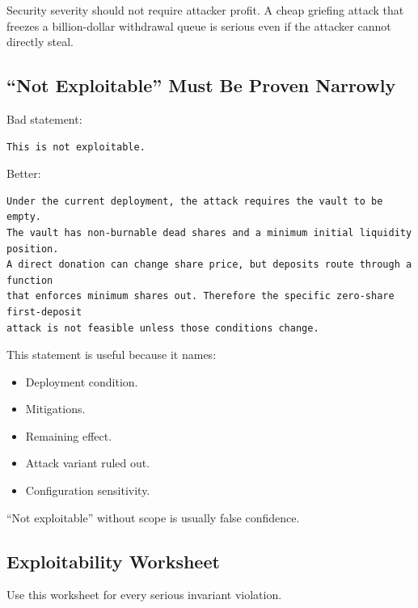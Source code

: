 Security severity should not require attacker profit. A cheap griefing
attack that freezes a billion-dollar withdrawal queue is serious even if
the attacker cannot directly steal.

\subsection{``Not Exploitable'' Must Be Proven Narrowly}

Bad statement:

\begin{lstlisting}
This is not exploitable.
\end{lstlisting}

Better:

\begin{lstlisting}
Under the current deployment, the attack requires the vault to be empty.
The vault has non-burnable dead shares and a minimum initial liquidity position.
A direct donation can change share price, but deposits route through a function
that enforces minimum shares out. Therefore the specific zero-share first-deposit
attack is not feasible unless those conditions change.
\end{lstlisting}

This statement is useful because it names:

\begin{itemize}
\tightlist
\item
  Deployment condition.
\item
  Mitigations.
\item
  Remaining effect.
\item
  Attack variant ruled out.
\item
  Configuration sensitivity.
\end{itemize}

``Not exploitable'' without scope is usually false confidence.

\subsection{Exploitability Worksheet}

Use this worksheet for every serious invariant violation.

